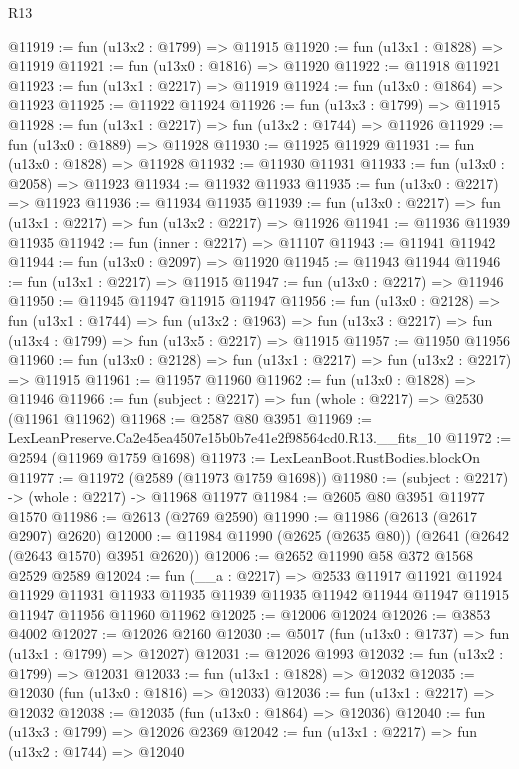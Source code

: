 \begin{lexlean}{R13}
\begin{coremodule}
@11919 := fun (u13x2 : @1799) => @11915
@11920 := fun (u13x1 : @1828) => @11919
@11921 := fun (u13x0 : @1816) => @11920
@11922 := @11918 @11921
@11923 := fun (u13x1 : @2217) => @11919
@11924 := fun (u13x0 : @1864) => @11923
@11925 := @11922 @11924
@11926 := fun (u13x3 : @1799) => @11915
@11928 := fun (u13x1 : @2217) => fun (u13x2 : @1744) => @11926
@11929 := fun (u13x0 : @1889) => @11928
@11930 := @11925 @11929
@11931 := fun (u13x0 : @1828) => @11928
@11932 := @11930 @11931
@11933 := fun (u13x0 : @2058) => @11923
@11934 := @11932 @11933
@11935 := fun (u13x0 : @2217) => @11923
@11936 := @11934 @11935
@11939 := fun (u13x0 : @2217) => fun (u13x1 : @2217) => fun (u13x2 : @2217) => @11926
@11941 := @11936 @11939 @11935
@11942 := fun (inner : @2217) => @11107
@11943 := @11941 @11942
@11944 := fun (u13x0 : @2097) => @11920
@11945 := @11943 @11944
@11946 := fun (u13x1 : @2217) => @11915
@11947 := fun (u13x0 : @2217) => @11946
@11950 := @11945 @11947 @11915 @11947
@11956 := fun (u13x0 : @2128) =>
  fun (u13x1 : @1744) =>
  fun (u13x2 : @1963) => fun (u13x3 : @2217) => fun (u13x4 : @1799) => fun (u13x5 : @2217) => @11915
@11957 := @11950 @11956
@11960 := fun (u13x0 : @2128) => fun (u13x1 : @2217) => fun (u13x2 : @2217) => @11915
@11961 := @11957 @11960
@11962 := fun (u13x0 : @1828) => @11946
@11966 := fun (subject : @2217) => fun (whole : @2217) => @2530 (@11961 @11962)
@11968 := @2587 @80 @3951
@11969 := LexLeanPreserve.Ca2e45ea4507e15b0b7e41e2f98564cd0.R13.__fits_10
@11972 := @2594 (@11969 @1759 @1698)
@11973 := LexLeanBoot.RustBodies.blockOn
@11977 := @11972 (@2589 (@11973 @1759 @1698))
@11980 := (subject : @2217) -> (whole : @2217) -> @11968 @11977
@11984 := @2605 @80 @3951 @11977 @1570
@11986 := @2613 (@2769 @2590)
@11990 := @11986 (@2613 (@2617 @2907) @2620)
@12000 := @11984 @11990 (@2625 (@2635 @80)) (@2641 (@2642 (@2643 @1570) @3951 @2620))
@12006 := @2652 @11990 @58 @372 @1568 @2529 @2589
@12024 := fun (__a : @2217) =>
  @2533
    @11917
    @11921
    @11924
    @11929
    @11931
    @11933
    @11935
    @11939
    @11935
    @11942
    @11944
    @11947
    @11915
    @11947
    @11956
    @11960
    @11962
@12025 := @12006 @12024
@12026 := @3853 @4002
@12027 := @12026 @2160
@12030 := @5017 (fun (u13x0 : @1737) => fun (u13x1 : @1799) => @12027)
@12031 := @12026 @1993
@12032 := fun (u13x2 : @1799) => @12031
@12033 := fun (u13x1 : @1828) => @12032
@12035 := @12030 (fun (u13x0 : @1816) => @12033)
@12036 := fun (u13x1 : @2217) => @12032
@12038 := @12035 (fun (u13x0 : @1864) => @12036)
@12040 := fun (u13x3 : @1799) => @12026 @2369
@12042 := fun (u13x1 : @2217) => fun (u13x2 : @1744) => @12040

\end{coremodule}
\end{lexlean}
